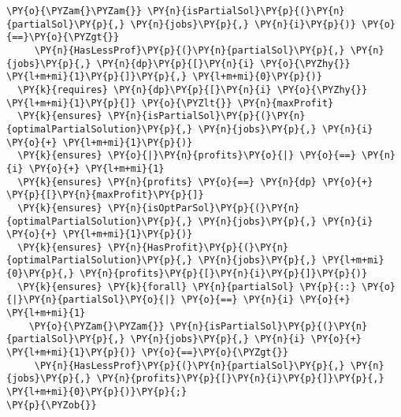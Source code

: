 \begin{itemize}
\begin{Verbatim}[commandchars=\\\{\}, fontsize=\footnotesize]
    \PY{o}{\PYZam{}\PYZam{}} \PY{n}{isPartialSol}\PY{p}{(}\PY{n}{partialSol}\PY{p}{,} \PY{n}{jobs}\PY{p}{,} \PY{n}{i}\PY{p}{)} \PY{o}{==}\PY{o}{\PYZgt{}} 
     \PY{n}{HasLessProf}\PY{p}{(}\PY{n}{partialSol}\PY{p}{,} \PY{n}{jobs}\PY{p}{,} \PY{n}{dp}\PY{p}{[}\PY{n}{i} \PY{o}{\PYZhy{}} \PY{l+m+mi}{1}\PY{p}{]}\PY{p}{,} \PY{l+m+mi}{0}\PY{p}{)}
  \PY{k}{requires} \PY{n}{dp}\PY{p}{[}\PY{n}{i} \PY{o}{\PYZhy{}} \PY{l+m+mi}{1}\PY{p}{]} \PY{o}{\PYZlt{}} \PY{n}{maxProfit}
  \PY{k}{ensures} \PY{n}{isPartialSol}\PY{p}{(}\PY{n}{optimalPartialSolution}\PY{p}{,} \PY{n}{jobs}\PY{p}{,} \PY{n}{i} \PY{o}{+} \PY{l+m+mi}{1}\PY{p}{)}
  \PY{k}{ensures} \PY{o}{|}\PY{n}{profits}\PY{o}{|} \PY{o}{==} \PY{n}{i} \PY{o}{+} \PY{l+m+mi}{1}
  \PY{k}{ensures} \PY{n}{profits} \PY{o}{==} \PY{n}{dp} \PY{o}{+} \PY{p}{[}\PY{n}{maxProfit}\PY{p}{]}
  \PY{k}{ensures} \PY{n}{isOptParSol}\PY{p}{(}\PY{n}{optimalPartialSolution}\PY{p}{,} \PY{n}{jobs}\PY{p}{,} \PY{n}{i} \PY{o}{+} \PY{l+m+mi}{1}\PY{p}{)}
  \PY{k}{ensures} \PY{n}{HasProfit}\PY{p}{(}\PY{n}{optimalPartialSolution}\PY{p}{,} \PY{n}{jobs}\PY{p}{,} \PY{l+m+mi}{0}\PY{p}{,} \PY{n}{profits}\PY{p}{[}\PY{n}{i}\PY{p}{]}\PY{p}{)}
  \PY{k}{ensures} \PY{k}{forall} \PY{n}{partialSol} \PY{p}{::} \PY{o}{|}\PY{n}{partialSol}\PY{o}{|} \PY{o}{==} \PY{n}{i} \PY{o}{+} \PY{l+m+mi}{1}
    \PY{o}{\PYZam{}\PYZam{}} \PY{n}{isPartialSol}\PY{p}{(}\PY{n}{partialSol}\PY{p}{,} \PY{n}{jobs}\PY{p}{,} \PY{n}{i} \PY{o}{+} \PY{l+m+mi}{1}\PY{p}{)} \PY{o}{==}\PY{o}{\PYZgt{}}
     \PY{n}{HasLessProf}\PY{p}{(}\PY{n}{partialSol}\PY{p}{,} \PY{n}{jobs}\PY{p}{,} \PY{n}{profits}\PY{p}{[}\PY{n}{i}\PY{p}{]}\PY{p}{,} \PY{l+m+mi}{0}\PY{p}{)}\PY{p}{;}
\PY{p}{\PYZob{}}


\end{Verbatim}
\end{itemize}
